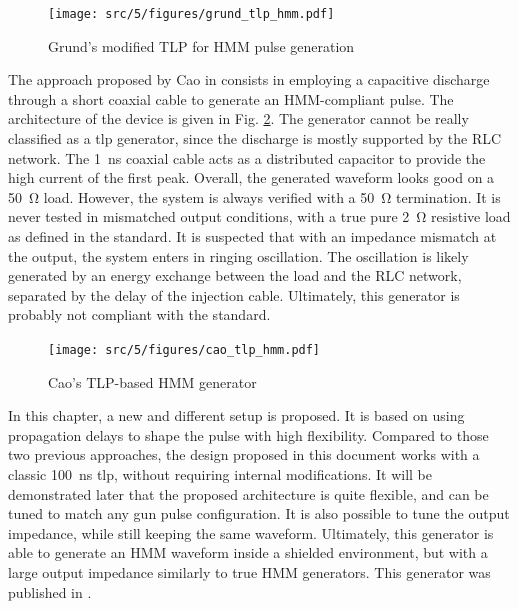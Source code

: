 \begin{figure}[!h]
  \centering
  \texttt{[image: src/5/figures/grund\_tlp\_hmm.pdf]}
  \caption{Grund's modified TLP for HMM pulse generation}
  \label{fig:grund_tlp_hmm}
\end{figure}

The approach proposed by Cao in \cite{tlp-based-hmm} consists in employing a capacitive discharge through a short coaxial cable to generate an HMM-compliant pulse.
The architecture of the device is given in Fig. \ref{fig:cao_tlp_hmm}.
The generator cannot be really classified as a \gls{tlp} generator, since the discharge is mostly supported by the RLC network. The \SI{1}{\nano\second} coaxial cable acts as a distributed capacitor to provide the high current of the first peak.
Overall, the generated waveform looks good on a \SI{50}{\ohm} load.
However, the system is always verified with a \SI{50}{\ohm} termination.
It is never tested in mismatched output conditions, with a true pure \SI{2}{\ohm} resistive load as defined in the standard.
It is suspected that with an impedance mismatch at the output, the system enters in ringing oscillation.
The oscillation is likely generated by an energy exchange between the load and the RLC network, separated by the delay of the injection cable.
Ultimately, this generator is probably not compliant with the standard.

\begin{figure}[!h]
  \centering
  \texttt{[image: src/5/figures/cao\_tlp\_hmm.pdf]}
  \caption{Cao's TLP-based HMM generator}
  \label{fig:cao_tlp_hmm}
\end{figure}

In this chapter, a new and different setup is proposed.
It is based on using propagation delays to shape the pulse with high flexibility.
Compared to those two previous approaches, the design proposed in this document works with a classic \SI{100}{\nano\second} \gls{tlp}, without requiring internal modifications.
It will be demonstrated later that the proposed architecture is quite flexible, and can be tuned to match any gun pulse configuration.
It is also possible to tune the output impedance, while still keeping the same waveform.
Ultimately, this generator is able to generate an HMM waveform inside a shielded environment, but with a large output impedance similarly to true HMM generators.
This generator was published in \cite{my-publi-tlp-hmm}.
